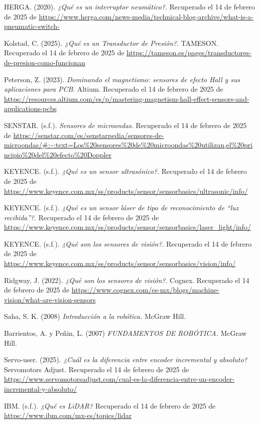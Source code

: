 \begin{thebibliography}{99}
	
	
	HERGA. (2020). 
	\textit{¿Qué es un interruptor neumático?}. Recuperado el 14 de febrero de 2025 de \url{https://www.herga.com/news-media/technical-blog-archive/what-is-a-pneumatic-switch-}
	
	Kolstad, C. (2025). 
	\textit{¿Qué es un Transductor de Presión?}. TAMESON. Recuperado el 14 de febrero de 2025 de \url{https://tameson.es/pages/transductores-de-presion-como-funcionan}
	
	Peterson, Z. (2023). 
	\textit{Dominando el magnetismo: sensores de efecto Hall y sus aplicaciones para PCB}. Altium. Recuperado el 14 de febrero de 2025 de \url{https://resources.altium.com/es/p/mastering-magnetism-hall-effect-sensors-and-applications-pcbs}
	
	SENSTAR. (s.f.). 
	\textit{Sensores de microondas}. Recuperado el 14 de febrero de 2025 de \url{https://senstar.com/es/senstarpedia/sensores-de-microondas/#:~:text=Los%20sensores%20de%20microondas%20utilizan,el%20principio%20del%20efecto%20Doppler}
	
	KEYENCE. (s.f.). 
	\textit{¿Qué es un sensor ultrasónico?}. Recuperado el 14 de febrero de 2025 de \url{https://www.keyence.com.mx/ss/products/sensor/sensorbasics/ultrasonic/info/}
	
	KEYENCE. (s.f.). 
	\textit{¿Qué es un sensor láser de tipo de reconocimiento de “luz recibida”?}. Recuperado el 14 de febrero de 2025 de \url{https://www.keyence.com.mx/ss/products/sensor/sensorbasics/laser_light/info/}
	
	KEYENCE. (s.f.). 
	\textit{¿Qué son los sensores de visión?}. Recuperado el 14 de febrero de 2025 de \url{https://www.keyence.com.mx/ss/products/sensor/sensorbasics/vision/info/}
	
	Ridgway, J. (2022). 
	\textit{¿Qué son los sensores de visión?}. Cognex. Recuperado el 14 de febrero de 2025 de \url{https://www.cognex.com/es-mx/blogs/machine-vision/what-are-vision-sensors}
	
	Saha, S. K. (2008)
	\textit{Introducción a la robótica.} McGraw Hill.
	
	Barrientos, A. y Peñin, L. (2007) 
	\textit{FUNDAMENTOS DE ROBÓTICA.} McGraw Hill.
	
	Servo-user. (2025). 
	\textit{¿Cuál es la diferencia entre encoder incremental y absoluto?}Servomotors Adjust. Recuperado el 14 de febrero de 2025 de \url{https://www.servomotorsadjust.com/cual-es-la-diferencia-entre-un-encoder-incremental-y-absoluto/}

	IBM. (s.f.). 
	\textit{¿Qué es LiDAR?}  Recuperado el 14 de febrero de 2025 de \url{https://www.ibm.com/mx-es/topics/lidar}
	
	
\end{thebibliography}

